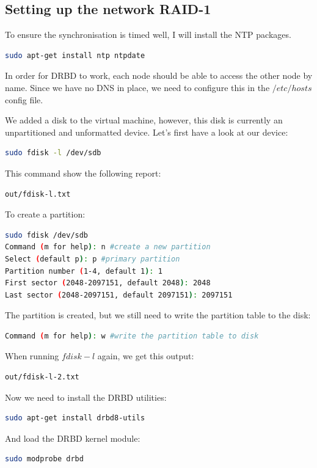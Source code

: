 \documentclass[12pt]{report}
\begin{document}
\subsection{Setting up the network RAID-1}
To ensure the synchronisation is timed well, I will install the NTP packages.
\begin{lstlisting}[language=bash]
sudo apt-get install ntp ntpdate
\end{lstlisting}

In order for DRBD to work, each node should be able to access the
other node by name. Since we have no DNS in place, we need to
configure this in the $/etc/hosts$ config file.

We added a disk to the virtual machine, however, this disk is
currently an unpartitioned and unformatted device.
Let's first have a look at our device:
\begin{lstlisting}[language=bash]
sudo fdisk -l /dev/sdb
\end{lstlisting}
This command show the following report:
\begin{lstlisting}[language=bash]
out/fdisk-l.txt
\end{lstlisting}
To create a partition:
\begin{lstlisting}[language=bash]
sudo fdisk /dev/sdb
Command (m for help): n #create a new partition
Select (default p): p #primary partition
Partition number (1-4, default 1): 1
First sector (2048-2097151, default 2048): 2048
Last sector (2048-2097151, default 2097151): 2097151
\end{lstlisting}
The partition is created, but we still need to write the partition
table to the disk:
\begin{lstlisting}[language=bash]
Command (m for help): w #write the partition table to disk
\end{lstlisting}
When running $fdisk -l$ again, we get this output:
\begin{lstlisting}[language=bash]
out/fdisk-l-2.txt
\end{lstlisting}

Now we need to install the DRBD utilities:
\begin{lstlisting}[language=bash]
sudo apt-get install drbd8-utils
\end{lstlisting}
And load the DRBD kernel module:
\begin{lstlisting}[language=bash]
sudo modprobe drbd
\end{lstlisting}
\end{document}
